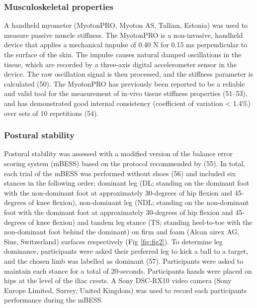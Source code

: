\documentclass[
  english,
  man]{apa6}
\begin{document}
\hypertarget{musculoskeletal-properties}{%
\subsubsection{Musculoskeletal properties}\label{musculoskeletal-properties}}

A handheld myometer (MyotonPRO, Myoton AS, Tallinn, Estonia) was used to measure passive muscle stiffness.
The MyotonPRO is a non-invasive, handheld device that applies a mechanical impulse of 0.40 N for 0.15 ms perpendicular to the surface of the skin.
The impulse causes natural damped oscillations in the tissue, which are recorded by a three-axis digital accelerometer sensor in the device.
The raw oscillation signal is then processed, and the stiffness parameter is calculated (50).
The MyotonPRO has previously been reported to be a reliable and valid tool for the measurement of in-vivo tissue stiffness properties (51--53), and has demonstrated good internal consistency (coefficient of variation \textless{} 1.4\%) over sets of 10 repetitions (54).

\hypertarget{postural-stability}{%
\subsubsection{Postural stability}\label{postural-stability}}

Postural stability was assessed with a modified version of the balance error scoring system (mBESS) based on the protocol recommended by (55).
In total, each trial of the mBESS was performed without shoes (56) and included six stances in the following order; dominant leg (DL; standing on the dominant foot with the non-dominant foot at approximately 30-degrees of hip flexion and 45-degrees of knee flexion),
non-dominant leg (NDL; standing on the non-dominant foot with the dominant foot at approximately 30-degrees of hip flexion and 45-degrees of knee flexion)
and tandem leg stance (TS; standing heel-to-toe with the non-dominant foot behind the dominant) on firm and foam (Alcan airex AG, Sins, Switzerland) surfaces respectively (Fig \ref{fig:fig2}).
To determine leg dominance, participants were asked their preferred leg to kick a ball to a target, and the chosen limb was labelled as dominant (57).
Participants were asked to maintain each stance for a total of 20-seconds.
Participants hands were placed on hips at the level of the iliac crests.
A Sony DSC-RX10 video camera (Sony Europe Limited, Surrey, United Kingdom) was used to record each participants performance during the mBESS.
\end{document}
